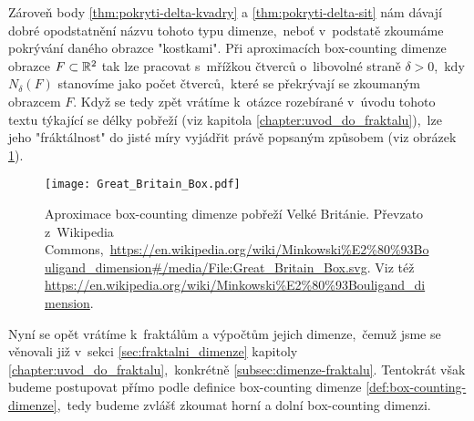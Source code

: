 Zároveň body \ref{thm:pokryti-delta-kvadry} a \ref{thm:pokryti-delta-sit} nám dávají dobré opodstatnění názvu tohoto typu dimenze,~neboť v~podstatě zkoumáme pokrývání daného obrazce "kostkami". Při aproximacích box-counting dimenze obrazce $F\subset\mathbb{R}^2$ tak lze pracovat s~mřížkou čtverců o~libovolné straně $\delta>0$,~kdy $N_\delta(F)$ stanovíme jako počet čtverců,~které se překrývají se zkoumaným obrazcem $F$. Když se tedy zpět vrátíme k~otázce rozebírané v~úvodu tohoto textu týkající se délky pobřeží (viz kapitola \ref{chapter:uvod_do_fraktalu}),~lze jeho "fráktálnost" do jisté míry vyjádřit právě popsaným způsobem (viz obrázek \ref{fig:aproximace-delky-pobrezi-vb}).
\begin{figure}[h]
    \centering
    \texttt{[image: Great\_Britain\_Box.pdf]}
    \caption[Aproximace box-counting dimenze pobřeží Velké Británie]{Aproximace box-counting dimenze pobřeží Velké Británie. Převzato z~Wikipedia Commons,~\url{https://en.wikipedia.org/wiki/Minkowski\%E2\%80\%93Bouligand\_dimension\#/media/File:Great\_Britain\_Box.svg}. Viz též \url{https://en.wikipedia.org/wiki/Minkowski\%E2\%80\%93Bouligand\_dimension}.}
    \label{fig:aproximace-delky-pobrezi-vb}
\end{figure}
Nyní se opět vrátíme k~fraktálům a výpočtům jejich dimenze,~čemuž jsme se věnovali již v~sekci \ref{sec:fraktalni_dimenze} kapitoly \ref{chapter:uvod_do_fraktalu},~konkrétně \ref{subsec:dimenze-fraktalu}. Tentokrát však budeme postupovat přímo podle definice box-counting dimenze \ref{def:box-counting-dimenze},~tedy budeme zvlášť zkoumat horní a dolní box-counting dimenzi.
